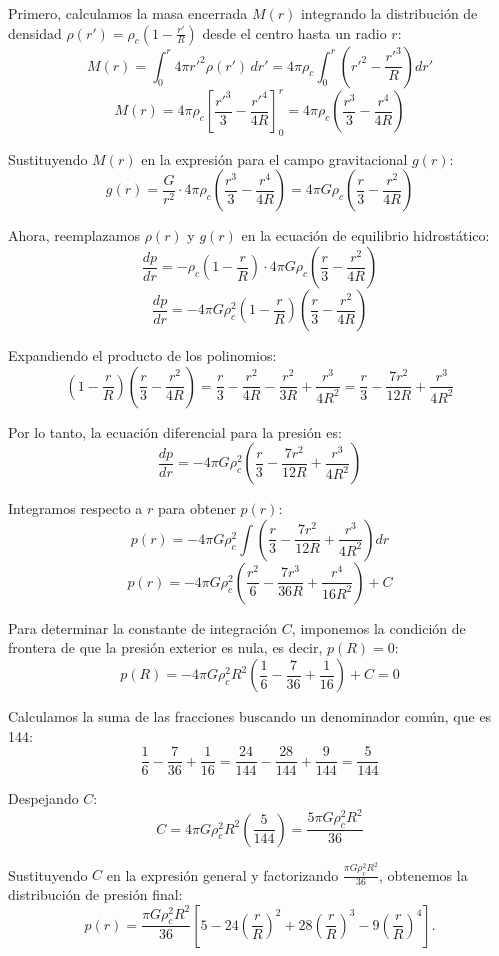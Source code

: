 \documentclass[11pt,a4paper]{article}
\begin{document}
Primero, calculamos la masa encerrada $M(r)$ integrando la distribución de densidad $\rho(r') = \rho_c \left(1 - \frac{r'}{R}\right)$ desde el centro hasta un radio $r$:
\[
M(r) = \int_0^r 4\pi r'^2 \rho(r') \, dr' = 4\pi \rho_c \int_0^r \left(r'^2 - \frac{r'^3}{R}\right) dr'
\]
\[
M(r) = 4\pi \rho_c \left[ \frac{r'^3}{3} - \frac{r'^4}{4R} \right]_0^r = 4\pi \rho_c \left( \frac{r^3}{3} - \frac{r^4}{4R} \right)
\]

Sustituyendo $M(r)$ en la expresión para el campo gravitacional $g(r)$:
\[
g(r) = \frac{G}{r^2} \cdot 4\pi \rho_c \left( \frac{r^3}{3} - \frac{r^4}{4R} \right) = 4\pi G \rho_c \left( \frac{r}{3} - \frac{r^2}{4R} \right)
\]

Ahora, reemplazamos $\rho(r)$ y $g(r)$ en la ecuación de equilibrio hidrostático:
\[
\frac{dp}{dr} = -\rho_c \left(1 - \frac{r}{R}\right) \cdot 4\pi G \rho_c \left( \frac{r}{3} - \frac{r^2}{4R} \right)
\]
\[
\frac{dp}{dr} = -4\pi G \rho_c^2 \left(1 - \frac{r}{R}\right) \left( \frac{r}{3} - \frac{r^2}{4R} \right)
\]

Expandiendo el producto de los polinomios:
\[
\left(1 - \frac{r}{R}\right) \left( \frac{r}{3} - \frac{r^2}{4R} \right) = \frac{r}{3} - \frac{r^2}{4R} - \frac{r^2}{3R} + \frac{r^3}{4R^2} = \frac{r}{3} - \frac{7r^2}{12R} + \frac{r^3}{4R^2}
\]

Por lo tanto, la ecuación diferencial para la presión es:
\[
\frac{dp}{dr} = -4\pi G \rho_c^2 \left( \frac{r}{3} - \frac{7r^2}{12R} + \frac{r^3}{4R^2} \right)
\]

Integramos respecto a $r$ para obtener $p(r)$:
\[
p(r) = -4\pi G \rho_c^2 \int \left( \frac{r}{3} - \frac{7r^2}{12R} + \frac{r^3}{4R^2} \right) dr
\]
\[
p(r) = -4\pi G \rho_c^2 \left( \frac{r^2}{6} - \frac{7r^3}{36R} + \frac{r^4}{16R^2} \right) + C
\]

Para determinar la constante de integración $C$, imponemos la condición de frontera de que la presión exterior es nula, es decir, $p(R) = 0$:
\[
p(R) = -4\pi G \rho_c^2 R^2 \left( \frac{1}{6} - \frac{7}{36} + \frac{1}{16} \right) + C = 0
\]

Calculamos la suma de las fracciones buscando un denominador común, que es 144:
\[
\frac{1}{6} - \frac{7}{36} + \frac{1}{16} = \frac{24}{144} - \frac{28}{144} + \frac{9}{144} = \frac{5}{144}
\]

Despejando $C$:
\[
C = 4\pi G \rho_c^2 R^2 \left( \frac{5}{144} \right) = \frac{5\pi G \rho_c^2 R^2}{36}
\]

Sustituyendo $C$ en la expresión general y factorizando $\frac{\pi G \rho_c^2 R^2}{36}$, obtenemos la distribución de presión final:
\[
\boxed{
p(r) = \frac{\pi G \rho_c^2 R^2}{36} \left[ 5 - 24\left(\frac{r}{R}\right)^2 + 28\left(\frac{r}{R}\right)^3 - 9\left(\frac{r}{R}\right)^4 \right]
}.
\]
\end{document}
